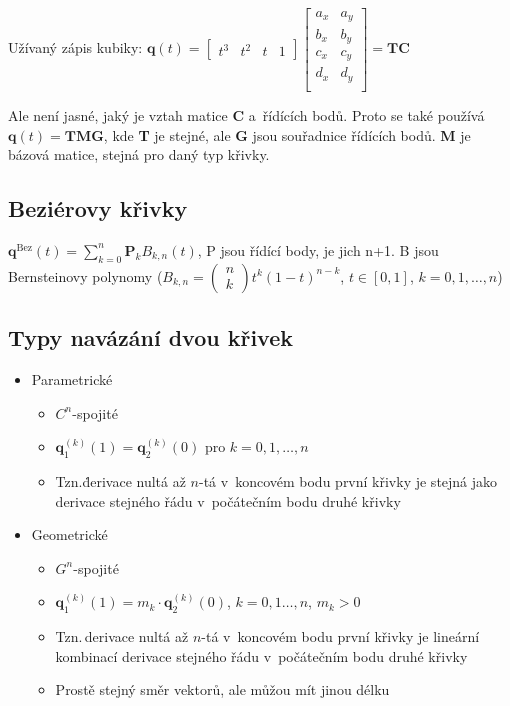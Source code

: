 Užívaný zápis kubiky: \(\mathrm{\textbf{q}}(t)=\begin{bmatrix}
    t^3 & t^2 & t & 1
\end{bmatrix}
\begin{bmatrix}
    a_x & a_y \\
    b_x & b_y \\
    c_x & c_y \\
    d_x & d_y \\
\end{bmatrix}
=\mathrm{\textbf{TC}}\)

Ale není jasné, jaký je vztah matice \textbf{C} a~řídících bodů. Proto se také používá \(\textbf{q}(t)=\textbf{TMG}\), kde \textbf{T} je stejné, ale \textbf{G} jsou souřadnice řídících bodů. \textbf{M} je bázová matice, stejná pro daný typ křivky.

\subsection{Beziérovy křivky}
\(\textbf{q}^\mathrm{Bez}(t)=\sum^n_{k=0}\mathbf{P}_kB_{k,n}(t)\),
P jsou řídící body, je jich n+1. B jsou Bernsteinovy polynomy (\(B_{k,n}=\left(\begin{array}{c}
    n \\
    k
\end{array}\right)t^k(1-t)^{n-k}
\), \(t\in[0,1]\), \(k=0, 1, \dots,n\))


\subsection{Typy navázání dvou křivek}

\begin{itemize}
    \item Parametrické
    \begin{itemize}
        \item \(C^n\)-spojité
        \item \(\mathbf{q}_1^{(k)}(1)=\mathbf{q}_2^{(k)}(0)\) pro \(k=0,1,\dots,n\)
        \item Tzn.\.derivace nultá až \(n\)-tá v~koncovém bodu první křivky je stejná jako derivace stejného řádu v~počátečním bodu druhé křivky 
    \end{itemize}
    \item Geometrické
    \begin{itemize}
        \item \(G^n\)-spojité
        \item \(\mathbf{q}_1^{(k)}(1)=m_k\cdot \mathbf{q}_2^{(k)}(0)\), \(k=0,1\dots,n\), \(m_k>0\)
        \item Tzn.\,derivace nultá až \(n\)-tá v~koncovém bodu první křivky je lineární kombinací derivace stejného řádu v~počátečním bodu druhé křivky
        \item Prostě stejný směr vektorů, ale můžou mít jinou délku
    \end{itemize}
\end{itemize}


